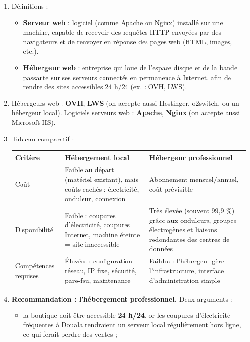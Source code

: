 \documentclass[11pt]{article}
\newcommand{\cle}[1]{{\popxbold\color{popdark}#1}}
\begin{document}
\begin{corrige}
\begin{enumerate}
\item Définitions :
\begin{itemize}
\item \textbf{\cle{Serveur web}} : logiciel (comme Apache ou Nginx) installé sur une machine, capable de recevoir des requêtes HTTP envoyées par des navigateurs et de renvoyer en réponse des pages web (HTML, images, etc.).
\item \textbf{\cle{Hébergeur web}} : entreprise qui loue de l'espace disque et de la bande passante sur ses serveurs connectés en permanence à Internet, afin de rendre des sites accessibles 24 h/24 (ex. : OVH, LWS).
\end{itemize}
\item Hébergeurs web : \textbf{OVH}, \textbf{LWS} (on accepte aussi Hostinger, o2switch, ou un hébergeur local). Logiciels serveurs web : \textbf{Apache}, \textbf{Nginx} (on accepte aussi Microsoft IIS).
\item Tableau comparatif :
\begin{center}
\begin{tabularx}{\linewidth}{|l|X|X|}
\hline
\rowcolor{popblueL} \textbf{Critère} & \textbf{Hébergement local} & \textbf{Hébergeur professionnel} \\
\hline
Coût & Faible au départ (matériel existant), mais coûts cachés : électricité, onduleur, connexion & Abonnement mensuel/annuel, coût prévisible \\
\hline
Disponibilité & Faible : coupures d'électricité, coupures Internet, machine éteinte = site inaccessible & Très élevée (souvent 99,9 \%) grâce aux onduleurs, groupes électrogènes et liaisons redondantes des centres de données \\
\hline
Compétences requises & Élevées : configuration réseau, IP fixe, sécurité, pare-feu, maintenance & Faibles : l'hébergeur gère l'infrastructure, interface d'administration simple \\
\hline
\end{tabularx}
\end{center}
\item \textbf{Recommandation : l'hébergement professionnel.} Deux arguments :
\begin{itemize}
\item la boutique doit être accessible \textbf{24 h/24}, or les coupures d'électricité fréquentes à Douala rendraient un serveur local régulièrement hors ligne, ce qui ferait perdre des ventes ;

\end{itemize}
\end{enumerate}
\end{corrige}
\end{document}
